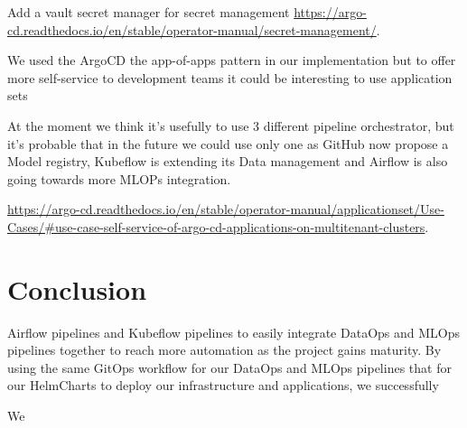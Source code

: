 Add a vault secret manager for secret management \url{https://argo-cd.readthedocs.io/en/stable/operator-manual/secret-management/}.

We used the ArgoCD the app-of-apps pattern in our implementation but to offer more self-service to development teams it could be interesting to use application sets

At the moment we think it's usefully to use 3 different pipeline orchestrator, but it's probable that in the future we could use only one as
GitHub now propose a Model registry, Kubeflow is extending its Data management and Airflow is also going towards more MLOPs integration.

\url{https://argo-cd.readthedocs.io/en/stable/operator-manual/applicationset/Use-Cases/#use-case-self-service-of-argo-cd-applications-on-multitenant-clusters}.


\section{Conclusion}\label{sec:conclusion}
Airflow pipelines and Kubeflow pipelines to easily integrate DataOps and MLOps pipelines together to reach more automation as the project gains maturity.
By using the same GitOps workflow for our DataOps and MLOps pipelines that for our HelmCharts to deploy our infrastructure and applications,
we successfully

We